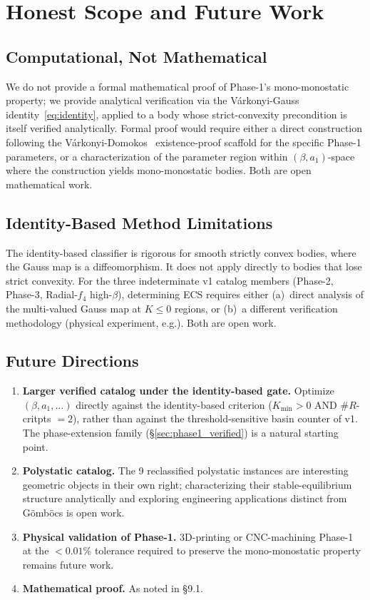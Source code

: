 \documentclass[11pt,a4paper]{article}
\begin{document}
\section{Honest Scope and Future Work}

\subsection{Computational, Not Mathematical}

We do not provide a formal mathematical proof of Phase-1's
mono-monostatic property; we provide analytical verification via
the V\'arkonyi-Gauss identity~\eqref{eq:identity}, applied to a
body whose strict-convexity precondition is itself verified
analytically. Formal proof would require either a direct
construction following the V\'arkonyi-Domokos~\cite{varkonyi2006}
existence-proof scaffold for the specific Phase-1 parameters, or a
characterization of the parameter region within
$(\beta, a_1)$-space where the construction yields
mono-monostatic bodies. Both are open mathematical work.

\subsection{Identity-Based Method Limitations}

The identity-based classifier is rigorous for smooth strictly convex
bodies, where the Gauss map is a diffeomorphism. It does not
apply directly to bodies that lose strict convexity. For the three
indeterminate v1 catalog members (Phase-2, Phase-3,
Radial-$f_4$ high-$\beta$), determining ECS requires either
(a)~direct analysis of the multi-valued Gauss map at $K \le 0$
regions, or (b)~a different verification methodology
(physical experiment, e.g.). Both are open work.

\subsection{Future Directions}

\begin{enumerate}[nosep]
\item \textbf{Larger verified catalog under the identity-based
  gate.} Optimize $(\beta, a_1, \ldots)$ directly against the
  identity-based criterion ($K_{\min} > 0$ AND
  $\#R$-critpts $= 2$), rather than against the threshold-sensitive
  basin counter of v1. The phase-extension family
  (\S\ref{sec:phase1_verified}) is a natural starting point.
\item \textbf{Polystatic catalog.} The 9 reclassified polystatic
  instances are interesting geometric objects in their own right;
  characterizing their stable-equilibrium structure analytically
  and exploring engineering applications distinct from G\"omb\"ocs
  is open work.
\item \textbf{Physical validation of Phase-1.} 3D-printing or
  CNC-machining Phase-1 at the $< 0.01\%$ tolerance required to
  preserve the mono-monostatic property remains future work.
\item \textbf{Mathematical proof.} As noted in \S 9.1.
\end{enumerate}
\end{document}
